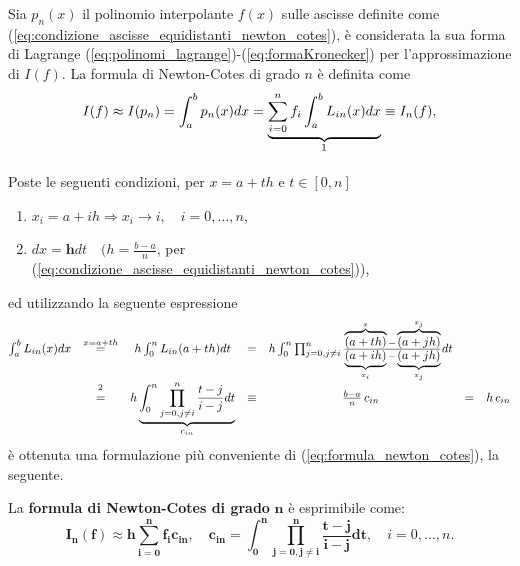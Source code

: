 \begin{definition}
	Sia $p_n(x)$ il polinomio interpolante $f(x)$ sulle ascisse definite come (\ref{eq:condizione_ascisse_equidistanti_newton_cotes}), è considerata la sua forma di Lagrange (\ref{eq:polinomi_lagrange})-(\ref{eq:formaKronecker}) per l'approssimazione di $I(f)$. La formula di Newton-Cotes di grado $n$ è definita come
	\begin{equation}\label{eq:formula_newton_cotes}
		I(f)\approx I(p_n) = \int_a^b p_n(x)dx=\underbrace{\sum_{i=0}^n f_i\int_a^b L_{in}(x)dx}_{\footnotemark}\equiv I_n(f),
	\end{equation}
\end{definition}

\noindent  Poste le seguenti condizioni, per $x=a+th$ e $t\in [0,n]$
\begin{enumerate}
    \item $x_i=a+ih\Rightarrow x_i\rightarrow i,\quad i=0,\hdots ,n$,
    \item $dx=\boldsymbol{h}dt\quad (h=\frac{b-a}{n}$, per (\ref{eq:condizione_ascisse_equidistanti_newton_cotes})),
\end{enumerate}
ed utilizzando la seguente espressione
\begin{equation*}
    \begin{matrix}
        \int_a^b L_{in}(x)dx&\overset{x=a+th}{=}&h\int_0^nL_{in}(a+th)dt&=& h\int_0^n\prod_{j=0,j\neq i}^{n}\frac{\overbrace{(a+th)}^x-\overbrace{(a+jh)}^{x_j}}{\underbrace{(a+ih)}_{x_i}-\underbrace{(a+jh)}_{x_j}}dt\\
        &\overset{\footnotemark}{=}&h\underbrace{\int_0^n\prod_{j=0,j\neq i}^n\frac{t-j}{i-j}dt}_{c_{in}} &\equiv& \frac{b-a}{n}\, c_{in} &=& h\,c_{in}
    \end{matrix}
\end{equation*}
è ottenuta una formulazione più conveniente di (\ref{eq:formula_newton_cotes}), la seguente.

\begin{definition}
	La \textbf{formula di Newton-Cotes di grado} $\boldsymbol n$ è esprimibile come:
	\begin{equation}\label{eq:formula_newton_cotes_conveniente}
	    \boldsymbol{I_n(f)\approx h\sum_{i=0}^n f_ic_{in}},\quad \boldsymbol{c_{in}=\int_0^n\prod_{j=0, j\neq i}^n \frac{t-j}{i-j}dt},\quad i=0, \hdots, n.
	\end{equation}
\end{definition}

